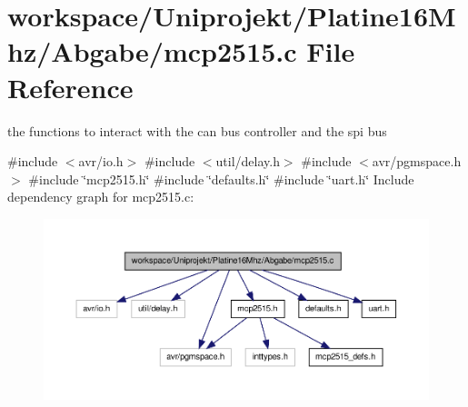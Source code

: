 \section{workspace/\-Uniprojekt/\-Platine16\-Mhz/\-Abgabe/mcp2515.c \-File \-Reference}
\label{mcp2515_8c}


the functions to interact with the can bus controller and the spi bus  


{\ttfamily \#include $<$avr/io.\-h$>$}\*
{\ttfamily \#include $<$util/delay.\-h$>$}\*
{\ttfamily \#include $<$avr/pgmspace.\-h$>$}\*
{\ttfamily \#include \char`\"{}mcp2515.\-h\char`\"{}}\*
{\ttfamily \#include \char`\"{}defaults.\-h\char`\"{}}\*
{\ttfamily \#include \char`\"{}uart.\-h\char`\"{}}\*
\-Include dependency graph for mcp2515.\-c\-:
\nopagebreak
\begin{figure}[H]
\begin{center}
\leavevmode
\includegraphics[width=350pt]{mcp2515_8c__incl}
\end{center}
\end{figure}
